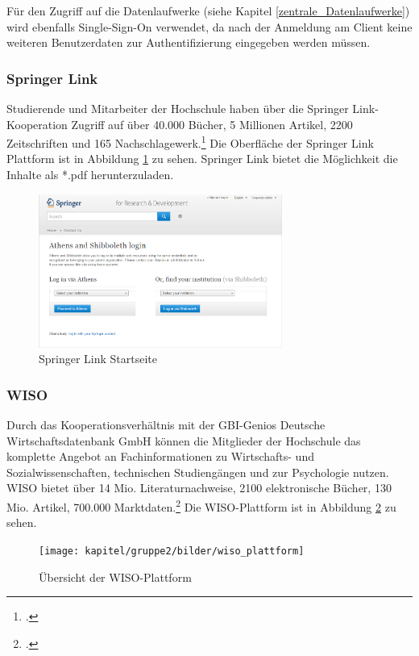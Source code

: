 Für den Zugriff auf die Datenlaufwerke (siehe Kapitel \ref{zentrale_Datenlaufwerke}) wird ebenfalls Single-Sign-On verwendet, da nach der Anmeldung am Client keine weiteren Benutzerdaten zur Authentifizierung eingegeben werden müssen. 

\subsubsection{Springer Link}
Studierende und Mitarbeiter der Hochschule haben über die Springer Link-Kooperation Zugriff auf über 40.000 Bücher, 5 Millionen Artikel, 2200 Zeitschriften und 165 Nachschlagewerk.\footcite{springer_springerlink_faq_2015} Die Oberfläche der Springer Link Plattform ist in Abbildung \ref{fig_springerlink_startseite} zu sehen. Springer Link bietet die Möglichkeit die Inhalte als *.pdf herunterzuladen. 

\begin{figure}
	\centering
	\includegraphics[width=8cm]{kapitel/gruppe2/bilder/springerlink_startseite}
	\caption{Springer Link Startseite \protect\footnotemark}
	\label{fig_springerlink_startseite}
\end{figure}

\subsubsection{WISO}
Durch das Kooperationsverhältnis mit der GBI-Genios Deutsche Wirtschaftsdatenbank GmbH können die Mitglieder der Hochschule das komplette Angebot an Fachinformationen zu Wirtschafts- und Sozialwissenschaften, technischen Studiengängen und zur Psychologie  nutzen. WISO bietet über 14 Mio. Literaturnachweise, 2100 elektronische Bücher, 130 Mio. Artikel, 700.000 Marktdaten.\footcite{gbi_genios_uber_wiso_2015} Die WISO-Plattform ist in Abbildung \ref{fig_wiso_plattform} zu sehen.

\begin{figure}
	\centering
	\texttt{[image: kapitel/gruppe2/bilder/wiso\_plattform]}
	\caption{Übersicht der WISO-Plattform \protect\footnotemark}
	\label{fig_wiso_plattform}
\end{figure}

